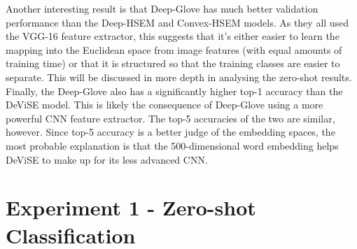 \documentclass[12pt]{report}
\begin{document}
Another interesting result is that Deep-Glove has much better validation performance than the Deep-HSEM and Convex-HSEM models. As they all used the VGG-16 feature extractor, this suggests that it's either easier to learn the mapping into the Euclidean space from image features (with equal amounts of training time) or that it is structured so that the training classes are easier to separate. This will be discussed in more depth in analysing the zero-shot results. Finally, the Deep-Glove also has a significantly higher top-1 accuracy than the DeViSE model. This is likely the consequence of Deep-Glove using a more powerful CNN feature extractor. The top-5 accuracies of the two are similar, however. Since top-5 accuracy is a better judge of the embedding spaces, the most probable explanation is that the 500-dimensional word embedding helps DeViSE to make up for its less advanced CNN.

\section{Experiment 1 - Zero-shot Classification}
\end{document}

